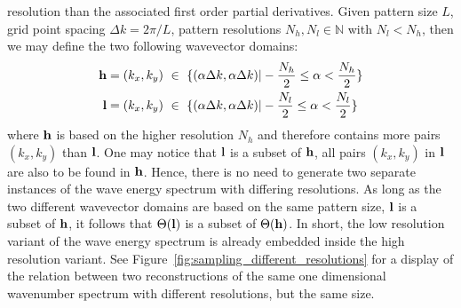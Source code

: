 resolution than the associated first order partial derivatives.
%
%
Given pattern size $L$, grid point spacing $\Delta k = 2\pi/L$, pattern
resolutions $N_h,N_l \in \mathbb{N}$ with $N_l < N_h$, then we may define the
two following wavevector domains:
%
\begin{align}
\mathbf{h} = (k_x,k_y)~&\in~\{(\alpha\Delta k,\alpha\Delta k)|-\frac{N_h}{2}\leq\alpha<\frac{N_h}{2}\}\\
\mathbf{l} = (k_x,k_y)~&\in~\{(\alpha\Delta k,\alpha\Delta k)|-\frac{N_l}{2}\leq\alpha<\frac{N_l}{2}\}
\end{align}
where $\mathbf{h}$ is based on the higher resolution $N_h$ and therefore contains
more pairs $(k_x, k_y)$ than $\mathbf{l}$. One may notice that $\mathbf{l}$ is a
subset of $\mathbf{h}$, all pairs $(k_x, k_y)$ in $\mathbf{l}$ are also to be found
in $\mathbf{h}$. Hence, there is no need to generate two separate instances of the
wave energy spectrum with differing resolutions.
As long as the two different wavevector domains are based on
the same pattern size, $\mathbf{l}$ is a subset of $\mathbf{h}$, it follows that
$\Theta(\mathbf{l})$ is a subset of $\Theta(\mathbf{h})$. In short, the low
resolution variant of the wave energy spectrum is already embedded inside the
high resolution variant. See Figure~\ref{fig:sampling_different_resolutions} for
a display of the relation between two reconstructions of the same one
dimensional wavenumber spectrum with different resolutions, but the same size.
%
%
